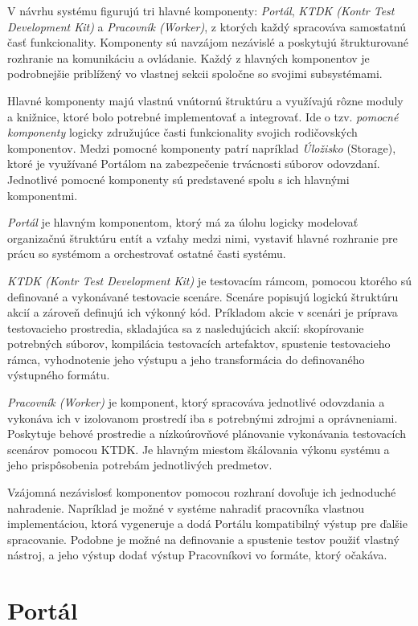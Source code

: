\documentclass[
  digital, %
  twoside, %
  table,   %
  lof,     %
  lot,     %
]{fithesis3}
\begin{document}
V návrhu systému figurujú tri hlavné komponenty: \emph{Portál}, \emph{KTDK (Kontr Test Development Kit)} a \emph{Pracovník (Worker)}, z ktorých každý spracováva samostatnú časť funkcionality. Komponenty sú navzájom nezávislé a poskytujú štrukturované rozhranie na komunikáciu a ovládanie. Každý z hlavných komponentov je podrobnejšie priblížený vo vlastnej sekcii spoločne so svojimi subsystémami.

Hlavné komponenty majú vlastnú vnútornú štruktúru a využívajú rôzne moduly a knižnice, ktoré bolo potrebné implementovať a integrovať. Ide o tzv. \emph{pomocné komponenty} logicky združujúce časti funkcionality svojich rodičovských komponentov. Medzi pomocné komponenty patrí napríklad \textit{Úložisko} (Storage), ktoré je využívané Portálom na zabezpečenie trvácnosti súborov odovzdaní. Jednotlivé pomocné komponenty sú predstavené spolu s ich hlavnými komponentmi.

\emph{Portál} je hlavným komponentom, ktorý má za úlohu logicky modelovať organizačnú štruktúru entít a vzťahy medzi nimi, vystaviť hlavné rozhranie pre prácu so systémom a orchestrovať ostatné časti systému. 

\emph{KTDK (Kontr Test Development Kit)} je testovacím rámcom, pomocou ktorého sú definované a vykonávané testovacie scenáre. Scenáre popisujú logickú štruktúru akcií a zároveň definujú ich výkonný kód. Príkladom akcie v scenári je príprava testovacieho prostredia, skladajúca sa z nasledujúcich akcií: skopírovanie potrebných súborov, kompilácia testovacích artefaktov, spustenie testovacieho rámca, vyhodnotenie jeho výstupu a jeho transformácia do definovaného výstupného formátu. 

\emph{Pracovník (Worker)} je komponent, ktorý spracováva jednotlivé odovzdania a vykonáva ich v izolovanom prostredí iba s potrebnými zdrojmi a oprávneniami. Poskytuje behové prostredie a nízkoúrovňové plánovanie vykonávania testovacích scenárov pomocou KTDK. Je hlavným miestom škálovania výkonu systému a jeho prispôsobenia potrebám jednotlivých predmetov.

Vzájomná nezávislosť komponentov pomocou rozhraní dovoľuje ich jednoduché nahradenie. Napríklad je možné v systéme nahradiť pracovníka vlastnou implementáciou, ktorá vygeneruje a dodá Portálu kompatibilný výstup pre ďalšie spracovanie. Podobne je možné na definovanie a spustenie testov použiť vlastný nástroj, a jeho výstup dodať výstup Pracovníkovi vo formáte, ktorý očakáva.

\section{Portál}
\end{document}
